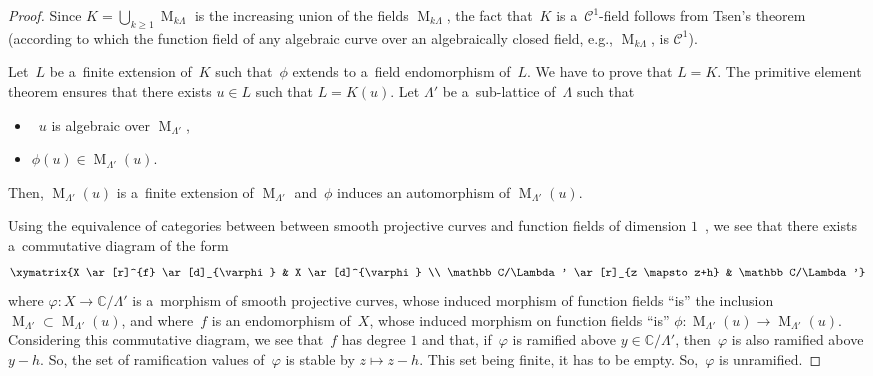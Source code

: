 \documentclass[11pt]{article}
\numberwithin{equation}{section}
\begin{document}
\begin{proof}
Since $K = \bigcup_{k \geq 1} \operatorname{M}_{k \Lambda}$ is the increasing union of the f\/ields
$\operatorname{M}_{k \Lambda}$, the fact that~$K$ is a~$\mathcal{C}^{1}$-f\/ield follows from Tsen's
theorem~\cite{LangQAC} (according to which the function f\/ield of any algebraic curve over an algebraically closed f\/ield,
e.g.,
$\operatorname{M}_{k \Lambda}$, is $\mathcal{C}^{1}$).

Let~$L$ be a~f\/inite extension of~$K$ such that~$\phi$ extends to a~f\/ield endomorphism of~$L$.
We have to prove that $L=K$.
The primitive element theorem ensures that there exists $u \in L$ such that $L=K(u)$.
Let $\Lambda'$ be a~sub-lattice of~$\Lambda$ such that
\begin{itemize}
\itemsep=0pt
\item~$u$ is algebraic over $\operatorname{M}_{\Lambda'}$,
\item $\phi(u) \in \operatorname{M}_{\Lambda'}(u)$.
\end{itemize}
Then, $\operatorname{M}_{\Lambda'}(u)$ is a~f\/inite extension of $\operatorname{M}_{\Lambda'}$ and~$\phi$ induces an
automorphism of $\operatorname{M}_{\Lambda'}(u)$.

Using the equivalence of categories between between smooth projective curves and function f\/ields of dimension
$1$~\cite[Corollary 6.12]{HartshorneAG}, we see that there exists a~commutative diagram of the form
\begin{gather*}
\xymatrix{X \ar[r]^{f} \ar[d]_{\varphi} &  X \ar[d]^{\varphi}
\\
\mathbb C/\Lambda' \ar[r]_{z \mapsto z+h}  & \mathbb C/\Lambda'}
\end{gather*}
where $\varphi: X \rightarrow \mathbb C/\Lambda'$ is a~morphism of smooth projective curves, whose induced morphism of
function f\/ields ``is'' the inclusion $\operatorname{M}_{\Lambda'} \subset \operatorname{M}_{\Lambda'}(u)$, and where~$f$
is an endomorphism of~$X$, whose induced morphism on function f\/ields ``is'' $\phi: \operatorname{M}_{\Lambda'}(u)
\rightarrow \operatorname{M}_{\Lambda'}(u)$.
Considering this commutative diagram, we see that~$f$ has degree $1$ and that, if~$\varphi$ is ramif\/ied above $y \in
\mathbb C/\Lambda'$, then~$\varphi$ is also ramif\/ied above $y-h$.
So, the set of ramif\/ication values of~$\varphi$ is stable by $z \mapsto z-h$.
This set being f\/inite, it has to be empty.
So,~$\varphi$ is unramif\/ied.


\end{proof}
\end{document}
